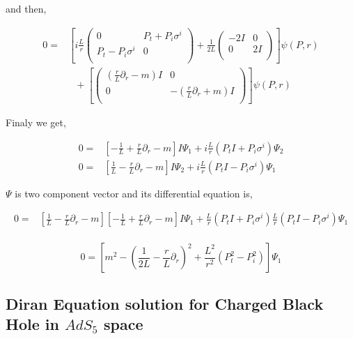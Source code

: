 and then,

\begin{align}
   0 =& \left[ i\frac{L}{r} \begin{pmatrix} 0 & P_t + P_i\sigma^i \\ P_t - P_i\sigma^i & 0 \\ \end{pmatrix} + \frac{1}{2L}\begin{pmatrix} -2I & 0 \\ 0 & 2I \\ \end{pmatrix} \right] \psi(P,r)\nonumber\\
      & ~~~ + \left[ \begin{pmatrix} (\frac{r}{L}\partial_r-m)I & 0 \\ 0 & -(\frac{r}{L}\partial_r+m)I \\ \end{pmatrix}  \right] \psi(P,r)
\end{align}

Finaly we get,

\begin{align}
   0 =& \left[ -\frac{1}{L} + \frac{r}{L}\partial_r - m \right]I\Psi_1 + i\frac{L}{r}(P_t I + P_i\sigma^i)\Psi_2 \nonumber\\
   0 =& \left[ \frac{1}{L} - \frac{r}{L}\partial_r - m \right]I\Psi_2 + i\frac{L}{r}(P_t I - P_i\sigma^i)\Psi_1
\end{align}

$\Psi$ is two component vector and its differential equation is,

\begin{align}
   0 =& \left[ \frac{1}{L} - \frac{r}{L}\partial_r - m \right]\left[ -\frac{1}{L} + \frac{r}{L}\partial_r - m \right]I\Psi_1 + \frac{L}{r}(P_t I + P_i\sigma^i)\frac{L}{r}(P_t I - P_i\sigma^i)\Psi_1 \nonumber\\
\end{align}

\begin{equation}
   0 = \left[ m^2 - \left(\frac{1}{2L} - \frac{r}{L}\partial_r \right)^2 + \frac{L^2}{r^2}\left(P_t^2 - P_i^2 \right) \right]\Psi_1
\end{equation}


\subsection{Diran Equation solution for Charged Black Hole in $AdS_5$ space}

